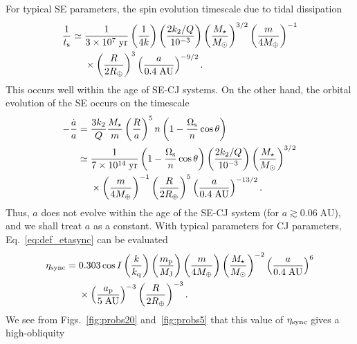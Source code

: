 \documentclass[
        fleqn,
        usenatbib,
        referee
    ]{mnras}
\newcommand*{\p}[1]{\left(#1\right)}
\begin{document}
For typical SE parameters, the spin evolution timescale due to tidal dissipation
\begin{align}
    \frac{1}{t_{\rm s}} \simeq{}& \frac{1}{3 \times 10^7\;\mathrm{yr}}
            \p{\frac{1}{4k}}
            \p{\frac{2k_2/Q}{10^{-3}}}
            \p{\frac{M_\star}{M_{\odot}}}^{3/2}
            \p{\frac{m}{4M_{\oplus}}}^{-1}\nonumber\\
        &\times \p{\frac{R}{2R_{\oplus}}}^3
            \p{\frac{a}{0.4\;\mathrm{AU}}}^{-9/2}.
            \label{eq:sehj_ts}
\end{align}
This occurs well within the age of SE-CJ systems. On the other hand,
the orbital evolution of the SE occurs on the timescale \citep[e.g.][]{lai2012}
\begin{align}
    -\frac{\dot{a}}{a} ={}& \frac{3k_2}{Q}\frac{M_\star}{m}
            \p{\frac{R}{a}}^5n \p{1 - \frac{\Omega_{\rm s}}{n}\cos \theta}\nonumber\\
        \simeq{}& \frac{1}{7 \times 10^{14}\;\mathrm{yr}}
            \p{1 - \frac{\Omega_{\rm s}}{n}\cos \theta}
            \p{\frac{2k_2/Q}{10^{-3}}}
            \p{\frac{M_\star}{M_{\odot}}}^{3/2}\nonumber\\
        &\times \p{\frac{m}{4M_{\oplus}}}^{-1}
            \p{\frac{R}{2R_{\oplus}}}^5
            \p{\frac{a}{0.4\;\mathrm{AU}}}^{-13/2}.\label{eq:sehj_adot}
\end{align}
Thus, $a$ does not evolve within the age of the SE-CJ system (for $a \gtrsim
0.06\;\mathrm{AU}$), and we shall treat $a$ as a constant. With typical
parameters for CJ parameters, Eq.~\eqref{eq:def_etasync} can be evaluated
\begin{align}
    \eta_{\rm sync} ={}& 0.303 \cos I
            \p{\frac{k}{k_{\rm q}}}
            \p{\frac{m_{\rm p}}{M_{\rm J}}}
            \p{\frac{m}{4M_{\oplus}}}
            \p{\frac{M_\star}{M_{\odot}}}^{-2}
            \p{\frac{a}{0.4\;\mathrm{AU}}}^{6}\nonumber\\
        &\times \p{\frac{a_{\rm p}}{5\;\mathrm{AU}}}^{-3}
            \p{\frac{R}{2R_{\oplus}}}^{-3}.\label{eq:sehj_etasync}
\end{align}
We see from Figs.~\ref{fig:probs20}
and~\ref{fig:probs5} that this value of $\eta_{\rm sync}$ gives a high-obliquity
\end{document}
